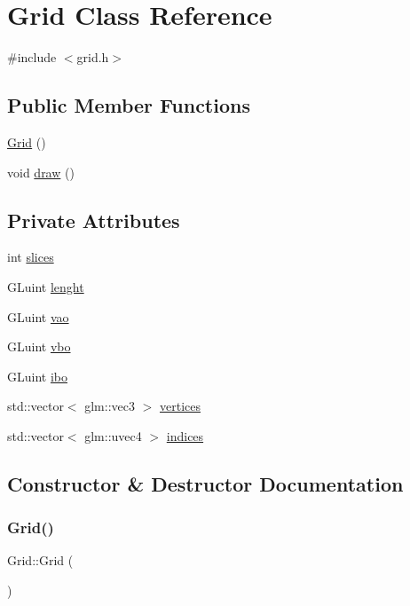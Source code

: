 \hypertarget{classGrid}{}\section{Grid Class Reference}
\label{classGrid}


{\ttfamily \#include $<$grid.\+h$>$}

\subsection*{Public Member Functions}
\begin{DoxyCompactItemize}
\item 
\hyperlink{classGrid_a4ac9ff4f63552b4c61ff90fcb35ad66c}{Grid} ()
\item 
void \hyperlink{classGrid_a96cdcd08912ae8330b1d81906e29dc68}{draw} ()
\end{DoxyCompactItemize}
\subsection*{Private Attributes}
\begin{DoxyCompactItemize}
\item 
int \hyperlink{classGrid_a58d873418c6c495513564fed624e4d0c}{slices}
\item 
G\+Luint \hyperlink{classGrid_a0dcafd46273017f38eaf9791b9f82311}{lenght}
\item 
G\+Luint \hyperlink{classGrid_a98b60ae0b20396def1ec753fd936266a}{vao}
\item 
G\+Luint \hyperlink{classGrid_a5c22c99ec1cf37851e3f64446b410f76}{vbo}
\item 
G\+Luint \hyperlink{classGrid_a9a3ae4bb51f9583d5695007e606536c1}{ibo}
\item 
std\+::vector$<$ glm\+::vec3 $>$ \hyperlink{classGrid_a1e33a498d07ad1d41dc060a082f136b2}{vertices}
\item 
std\+::vector$<$ glm\+::uvec4 $>$ \hyperlink{classGrid_a688eebc4f8d8f25e8da058a188419f5b}{indices}
\end{DoxyCompactItemize}


\subsection{Constructor \& Destructor Documentation}
\mbox{\label{classGrid_a4ac9ff4f63552b4c61ff90fcb35ad66c}} 
\subsubsection{\texorpdfstring{Grid()}{Grid()}}
{\footnotesize\ttfamily Grid\+::\+Grid (\begin{DoxyParamCaption}{ }\end{DoxyParamCaption})}



